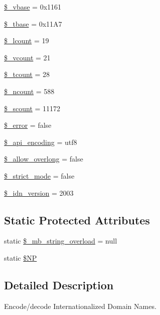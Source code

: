 \begin{DoxyCompactItemize}
\item 
\hyperlink{classidna__convert_a2e984a3fe1e2e4d5192dd9a5220e9c29}{\$\+\_\+vbase} = 0x1161
\item 
\hyperlink{classidna__convert_a5b728e6ff6e15773c914383a66651826}{\$\+\_\+tbase} = 0x11\+A7
\item 
\hyperlink{classidna__convert_ae191087842e21e5f56a0df02f922abbe}{\$\+\_\+lcount} = 19
\item 
\hyperlink{classidna__convert_afe217921aaa9aa954361f3aa090c69c1}{\$\+\_\+vcount} = 21
\item 
\hyperlink{classidna__convert_a81a70a95e18fde08ec6633f0095c92c6}{\$\+\_\+tcount} = 28
\item 
\hyperlink{classidna__convert_a0e6408f36ff8f150adb9d1a67c7fe3e2}{\$\+\_\+ncount} = 588
\item 
\hyperlink{classidna__convert_aa422586662f0878841bd8dcda663c058}{\$\+\_\+scount} = 11172
\item 
\hyperlink{classidna__convert_ae3825ac4f637ed992ef96f261647c396}{\$\+\_\+error} = false
\item 
\hyperlink{classidna__convert_abc9b2aaad4b02a40602f254ac44ab973}{\$\+\_\+api\+\_\+encoding} = \textquotesingle{}utf8\textquotesingle{}
\item 
\hyperlink{classidna__convert_a7a40288feb2a5635c567a28710017e56}{\$\+\_\+allow\+\_\+overlong} = false
\item 
\hyperlink{classidna__convert_a6457ade57cb55c7b44bfbf8686c2c2d5}{\$\+\_\+strict\+\_\+mode} = false
\item 
\hyperlink{classidna__convert_a14edc7c94d7c9c05a8a7eada24901dfd}{\$\+\_\+idn\+\_\+version} = 2003
\end{DoxyCompactItemize}
\subsection*{Static Protected Attributes}
\begin{DoxyCompactItemize}
\item 
static \hyperlink{classidna__convert_a36aba0d7717782343396a25026107dc7}{\$\+\_\+mb\+\_\+string\+\_\+overload} = null
\item 
static \hyperlink{classidna__convert_a82881f4c426f3e6603e252c8bebc875f}{\$\+N\+P}
\end{DoxyCompactItemize}


\subsection{Detailed Description}
Encode/decode Internationalized Domain Names.

